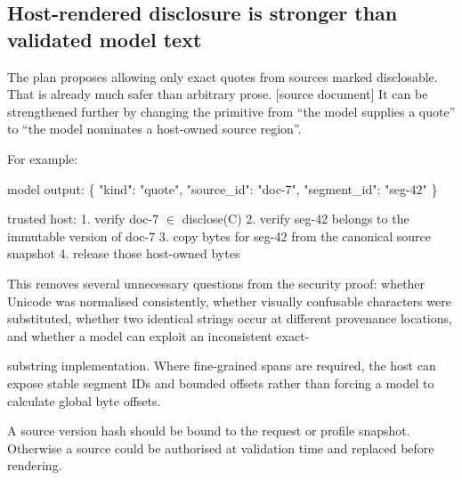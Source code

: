 \documentclass[11pt,a4paper]{article}
\begin{document}
\subsection*{Host-rendered disclosure is stronger than validated model text}
The plan proposes allowing only exact quotes from sources marked disclosable. That is already much safer than arbitrary prose. [source document] It can be strengthened further by changing the primitive from “the model supplies a quote” to “the model nominates a host-owned source region”.\par
For example:\par
model output: \{ "kind": "quote", "source\_id": "doc-7", "segment\_id": "seg-42" \}\par
trusted host: 1. verify doc-7  $\in$  disclose(C) 2. verify seg-42 belongs to the immutable version of doc-7 3. copy bytes for seg-42 from the canonical source snapshot 4. release those host-owned bytes\par
This removes several unnecessary questions from the security proof: whether Unicode was normalised consistently, whether visually confusable characters were substituted, whether two identical strings occur at different provenance locations, and whether a model can exploit an inconsistent exact-\par
substring implementation. Where fine-grained spans are required, the host can expose stable segment IDs and bounded offsets rather than forcing a model to calculate global byte offsets.\par
A source version hash should be bound to the request or profile snapshot. Otherwise a source could be authorised at validation time and replaced before rendering.\par
\end{document}
